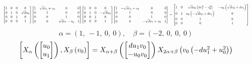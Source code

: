 \documentclass[11pt]{article}
\theoremstyle{definition}
\begin{document}
\[
\scaletoalign{\textwidth}{{\left[\begin{matrix}1 & 0 & 0 & 0\\0 & 1 & 0 & \sqrt{d} u_{0}\\0 & 0 & 1 & 0\\0 & 0 & 0 & 1\end{matrix}\right]} {\left[\begin{matrix}1 & \sqrt{d} v_{1} + v_{0} & 0 & 0\\0 & 1 & 0 & 0\\0 & 0 & 1 & 0\\0 & 0 & \sqrt{d} v_{1} - v_{0} & 1\end{matrix}\right]} {\left[\begin{matrix}1 & 0 & 0 & 0\\0 & 1 & 0 & - \sqrt{d} u_{0}\\0 & 0 & 1 & 0\\0 & 0 & 0 & 1\end{matrix}\right]} {\left[\begin{matrix}1 & - \sqrt{d} v_{1} - v_{0} & 0 & 0\\0 & 1 & 0 & 0\\0 & 0 & 1 & 0\\0 & 0 & - \sqrt{d} v_{1} + v_{0} & 1\end{matrix}\right]} = {\left[\begin{matrix}1 & 0 & \sqrt{d} u_{0} \left(d v_{1}^{2} - v_{0}^{2}\right) & - u_{0} \left(\sqrt{d} v_{0} + d v_{1}\right)\\0 & 1 & u_{0} \left(- \sqrt{d} v_{0} + d v_{1}\right) & 0\\0 & 0 & 1 & 0\\0 & 0 & 0 & 1\end{matrix}\right]}}
\]
\[
\alpha = \left( 1, \  -1, \  0, \  0\right), \quad \beta = \left( -2, \  0, \  0, \  0\right)
\]
\[
\scaletoalign{\textwidth}{\left[ X_{\alpha}\left(\left[\begin{matrix}u_{0}\\u_{1}\end{matrix}\right]\right), X_{\beta}\left(v_{0}\right) \right] = X_{\alpha + \beta}\left(\left[\begin{matrix}d u_{1} v_{0}\\- u_{0} v_{0}\end{matrix}\right]\right) X_{2\alpha + \beta}\left(v_{0} \left(- d u_{1}^{2} + u_{0}^{2}\right)\right)}
\]
\end{document}
